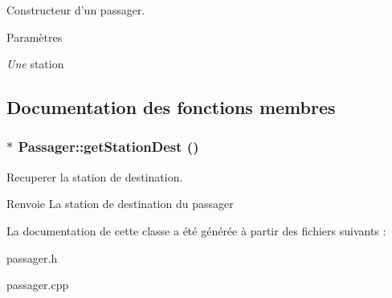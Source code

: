 Constructeur d'un passager. 


\begin{DoxyParams}{Paramètres}
\item[{\em Une}]station \end{DoxyParams}


\subsection{Documentation des fonctions membres}
\hypertarget{classPassager_a743190997fecd1b8b0660c2c93ca4f5f}{
\subsubsection[{getStationDest}]{ $\ast$ Passager::getStationDest ()}}
\label{classPassager_a743190997fecd1b8b0660c2c93ca4f5f}


Recuperer la station de destination. 

\begin{DoxyReturn}{Renvoie}
La station de destination du passager 
\end{DoxyReturn}


La documentation de cette classe a été générée à partir des fichiers suivants :\begin{DoxyCompactItemize}
\item 
passager.h\item 
passager.cpp\end{DoxyCompactItemize}

